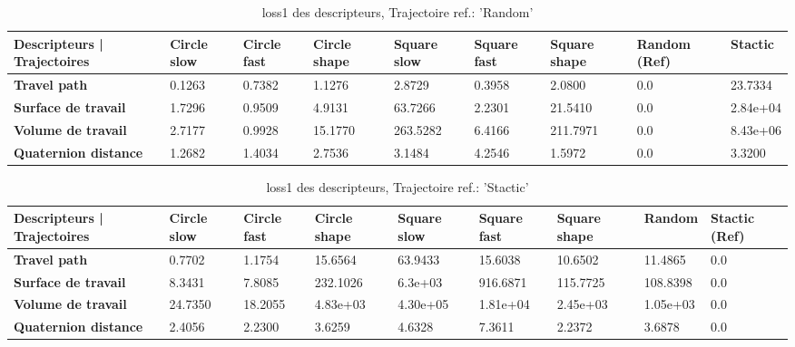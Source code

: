 \documentclass[8pt]{article}
\begin{document}
\begin{table}[H]
    \centering
    \begin{tabularx}{\textwidth}{|p{}|X|X|X|X|X|X|X|X|}
    \rowcolor{lightgray}
        \hline
        Descripteurs | Trajectoires &  Circle slow & Circle fast  &  Circle shape  & Square slow & Square fast & Square shape & \cellcolor[HTML]{238CCC} \textbf{Random (Ref)} & Stactic \\ \hline
        \textbf{Travel path} & 0.1263 & 0.7382 & 1.1276 & 2.8729 & 0.3958 & 2.0800 & 0.0 & 23.7334 \\ \hline
        \textbf{Surface de travail} & 1.7296 & 0.9509 & 4.9131 & 63.7266 & 2.2301 & 21.5410 & 0.0 & 2.84e+04 \\ \hline
        \textbf{Volume de travail} & 2.7177 & 0.9928 & 15.1770 & 263.5282 & 6.4166 & 211.7971 & 0.0 & 8.43e+06 \\ \hline
        \textbf{Quaternion distance} & 1.2682 & 1.4034 & 2.7536 & 3.1484 & 4.2546 & 1.5972 & 0.0 & 3.3200 \\ \hline  
    \end{tabularx}
    \caption{loss1 des descripteurs, Trajectoire ref.: 'Random'}
\end{table}

\begin{table}[H]
    \centering
    \begin{tabularx}{\textwidth}{|p{}|X|X|X|X|X|X|X|X|}
    \rowcolor{lightgray}
        \hline
        Descripteurs | Trajectoires &  Circle slow & Circle fast  &  Circle shape  & Square slow & Square fast & Square shape & Random  & \cellcolor[HTML]{238CCC} \textbf{Stactic (Ref)} \\ \hline
        \textbf{Travel path} & 0.7702 & 1.1754 & 15.6564 & 63.9433 & 15.6038 & 10.6502 & 11.4865 & 0.0 \\ \hline
        \textbf{Surface de travail} & 8.3431 & 7.8085 & 232.1026 & 6.3e+03 & 916.6871 & 115.7725 & 108.8398 & 0.0 \\ \hline
        \textbf{Volume de travail} & 24.7350 & 18.2055 & 4.83e+03 & 4.30e+05 & 1.81e+04 & 2.45e+03 & 1.05e+03 & 0.0 \\ \hline
        \textbf{Quaternion distance} & 2.4056 & 2.2300 & 3.6259 & 4.6328 & 7.3611 & 2.2372 & 3.6878 & 0.0 \\ \hline  
    \end{tabularx}
    \caption{loss1 des descripteurs, Trajectoire ref.: 'Stactic'}
\end{table}
\end{document}

